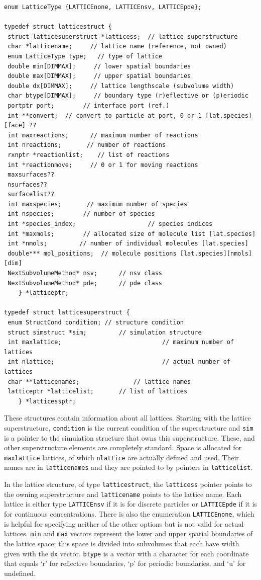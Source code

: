 \documentclass {scrbook}
\newcommand {\ttt} {\texttt}
\begin{document}
\begin{lstlisting}
enum LatticeType {LATTICEnone, LATTICEnsv, LATTICEpde};

typedef struct latticestruct {
 struct latticesuperstruct *latticess;	// lattice superstructure
 char *latticename;     // lattice name (reference, not owned)
 enum LatticeType type;   // type of lattice
 double min[DIMMAX];     // lower spatial boundaries
 double max[DIMMAX];     // upper spatial boundaries
 double dx[DIMMAX];     // lattice lengthscale (subvolume width)
 char btype[DIMMAX];     // boundary type (r)eflective or (p)eriodic
 portptr port;        // interface port (ref.)
 int **convert;  // convert to particle at port, 0 or 1 [lat.species][face] ??
 int maxreactions;      // maximum number of reactions
 int nreactions;       // number of reactions
 rxnptr *reactionlist;    // list of reactions
 int *reactionmove;     // 0 or 1 for moving reactions
 maxsurfaces??
 nsurfaces??
 surfacelist??
 int maxspecies;       // maximum number of species
 int nspecies;        // number of species
 int *species_index;					// species indices
 int *maxmols;        // allocated size of molecule list [lat.species]
 int *nmols;         // number of individual molecules [lat.species]
 double*** mol_positions;  // molecule positions [lat.species][nmols][dim]
 NextSubvolumeMethod* nsv;		// nsv class
 NextSubvolumeMethod* pde;		// pde class
	} *latticeptr;

typedef struct latticesuperstruct {
 enum StructCond condition;	// structure condition
 struct simstruct *sim;			// simulation structure
 int maxlattice;							// maximum number of lattices
 int nlattice;								// actual number of lattices
 char **latticenames;				// lattice names
 latticeptr *latticelist;		// list of lattices
	} *latticessptr;
\end{lstlisting}

These structures contain information about all lattices. Starting with the lattice superstructure, \ttt{condition} is the current condition of the superstructure and \ttt{sim} is a pointer to the simulation structure that owns this superstructure. These, and other superstructure elements are completely standard. Space is allocated for \ttt{maxlattice} lattices, of which \ttt{nlattice} are actually defined and used. Their names are in \ttt{latticenames} and they are pointed to by pointers in \ttt{latticelist}.

In the lattice structure, of type \ttt{latticestruct}, the \ttt{latticess} pointer points to the owning superstructure and \ttt{latticename} points to the lattice name. Each lattice is either type \ttt{LATTICEnsv} if it is for discrete particles or \ttt{LATTICEpde} if it is for continuous concentrations. There is also the enumeration \ttt{LATTICEnone}, which is helpful for specifying neither of the other options but is not valid for actual lattices. \ttt{min} and \ttt{max} vectors represent the lower and upper spatial boundaries of the lattice space; this space is divided into subvolumes that each have width given with the \ttt{dx} vector. \ttt{btype} is a vector with a character for each coordinate that equals `r' for reflective boundaries, `p' for periodic boundaries, and `u' for undefined.
\end{document}
